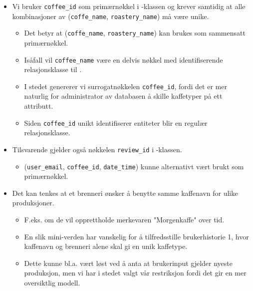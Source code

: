 \begin{itemize}
    \item Vi bruker \verb|coffee_id| som primærnøkkel i -klassen og krever samtidig at alle kombinasjoner av (\verb|coffe_name|, \verb|roastery_name|) må være unike.
    \begin{itemize}
        \item Det betyr at (\verb|coffe_name|, \verb|roastery_name|) kan brukes som sammensatt primærnøkkel.
        \item Isåfall vil \verb|coffee_name| være en delvis nøkkel med identifiserende relasjonsklasse til .
        \item I stedet genererer vi surrogatnøkkelen \verb|coffee_id|, fordi det er mer naturlig for administrator av databasen å skille kaffetyper på ett attributt.
        \item Siden \verb|coffee_id| unikt identifiserer entiteter blir  en regulær relasjonsklasse.
    \end{itemize}
    \item Tilsvarende gjelder også nøkkelen \verb|review_id| i -klassen.
    \begin{itemize}
        \item  (\verb|user_email|, \verb|coffee_id|, \verb|date_time|) kunne alternativt vært brukt som primærnøkkel.
    \end{itemize}
    \item Det kan tenkes at et brenneri ønsker å benytte samme kaffenavn for ulike produksjoner.
    \begin{itemize}
        \item F.eks. om de vil opprettholde merkevaren "Morgenkaffe" over tid.
        \item En slik mini-verden har vanskelig for å tilfredsstille brukerhistorie 1, hvor kaffenavn og brenneri alene skal gi en unik kaffetype.
        \item Dette kunne bl.a. vært løst ved å anta at brukerinput gjelder nyeste produksjon, men vi har i stedet valgt vår restriksjon fordi det gir en mer oversiktlig modell.
    \end{itemize}
\end{itemize}